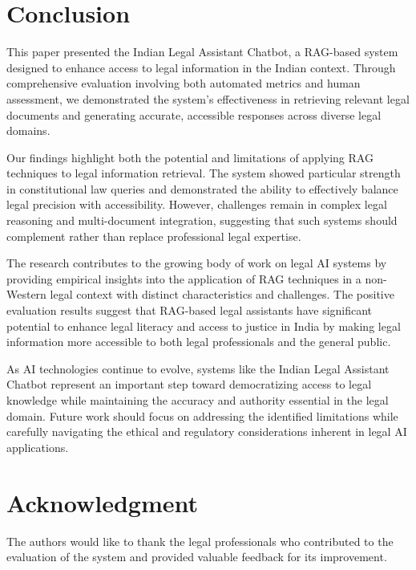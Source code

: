 \documentclass[conference]{IEEEtran}
\begin{document}
\section{Conclusion}

This paper presented the Indian Legal Assistant Chatbot, a RAG-based system designed to enhance access to legal information in the Indian context. Through comprehensive evaluation involving both automated metrics and human assessment, we demonstrated the system's effectiveness in retrieving relevant legal documents and generating accurate, accessible responses across diverse legal domains.

Our findings highlight both the potential and limitations of applying RAG techniques to legal information retrieval. The system showed particular strength in constitutional law queries and demonstrated the ability to effectively balance legal precision with accessibility. However, challenges remain in complex legal reasoning and multi-document integration, suggesting that such systems should complement rather than replace professional legal expertise.

The research contributes to the growing body of work on legal AI systems by providing empirical insights into the application of RAG techniques in a non-Western legal context with distinct characteristics and challenges. The positive evaluation results suggest that RAG-based legal assistants have significant potential to enhance legal literacy and access to justice in India by making legal information more accessible to both legal professionals and the general public.

As AI technologies continue to evolve, systems like the Indian Legal Assistant Chatbot represent an important step toward democratizing access to legal knowledge while maintaining the accuracy and authority essential in the legal domain. Future work should focus on addressing the identified limitations while carefully navigating the ethical and regulatory considerations inherent in legal AI applications.

\section{Acknowledgment}
The authors would like to thank the legal professionals who contributed to the evaluation of the system and provided valuable feedback for its improvement.

\balance

\end{document}
